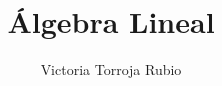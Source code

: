 \documentclass{report}
\begin{document}
\title{Álgebra Lineal}
\author{Victoria Torroja Rubio}
\date{}

\maketitle

\tableofcontents

\pagebreak

\end{document}
